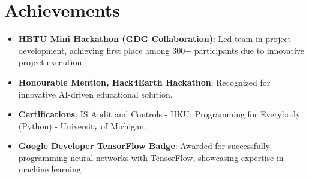 \documentclass[letterpaper,11pt]{article}
\newcommand{\resumeItem}[2]{
  \item\small{
    \textbf{#1}{: #2 \vspace{-2pt}}
  }
}
\newcommand{\resumeSubHeadingListStart}{\begin{itemize}[leftmargin=*]}
\newcommand{\resumeSubHeadingListEnd}{\end{itemize}}
\begin{document}
\section{Achievements}
 \resumeSubHeadingListStart
    \resumeItem{HBTU Mini Hackathon (GDG Collaboration)}{Led team in project development, achieving first place among 300+ participants due to innovative project execution.}
    \resumeItem{Honourable Mention, Hack4Earth Hackathon}{Recognized for innovative AI-driven educational solution.}
    \resumeItem{Certifications}{IS Audit and Controls - HKU; Programming for Everybody (Python) - University of Michigan.}
    \resumeItem{Google Developer TensorFlow Badge}{Awarded for successfully programming neural networks with TensorFlow, showcasing expertise in machine learning.}
 \resumeSubHeadingListEnd
\end{document}
